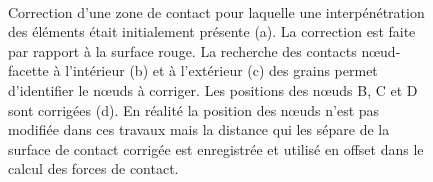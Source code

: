 \begin{figure}
{}\hfill~
			\caption{\label{fig05:contact_correction}Correction d'une zone de contact pour laquelle une interpénétration des éléments était initialement présente (a). La correction est faite par rapport à la surface rouge. La recherche des contacts n\oe{}ud-facette à l'intérieur (b) et à l'extérieur (c) des grains permet d'identifier le n\oe{}uds à corriger. Les positions des n\oe{}uds B, C et D sont corrigées (d). En réalité la position des n\oe{}uds n'est pas modifiée dans ces travaux mais la distance qui les sépare de la surface de contact corrigée est enregistrée et utilisé en offset dans le calcul des forces de contact.}
			\end{figure}
			
